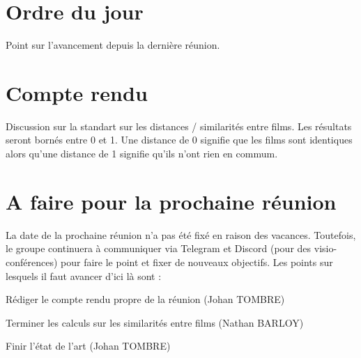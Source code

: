 \documentclass[11pt]{meetingmins}
\begin{document}
\maketitle

\section{Ordre du jour}
\begin{hiddenitems}
	\item Point sur l'avancement depuis la dernière réunion.
\end{hiddenitems}

\section {Compte rendu}
Discussion sur la standart sur les distances / similarités entre films.
Les résultats seront bornés entre 0 et 1. Une distance de 0 signifie que les films sont identiques alors qu'une distance de 1 signifie qu'ils n'ont rien en commum.

\section{A faire pour la prochaine réunion}
La date de la prochaine réunion n'a pas été fixé en raison des vacances. Toutefois, le groupe continuera à communiquer via Telegram et Discord (pour des visio-conférences) pour faire le point et fixer de nouveaux objectifs.
Les points sur lesquels il faut avancer d'ici là sont :
\begin{items}
	\item Rédiger le compte rendu propre de la réunion (Johan TOMBRE)
	\item Terminer les calculs sur les similarités entre films (Nathan BARLOY)
	\item Finir l'état de l'art (Johan TOMBRE)
\end{items}
\vspace{1cm}
\end{document}
